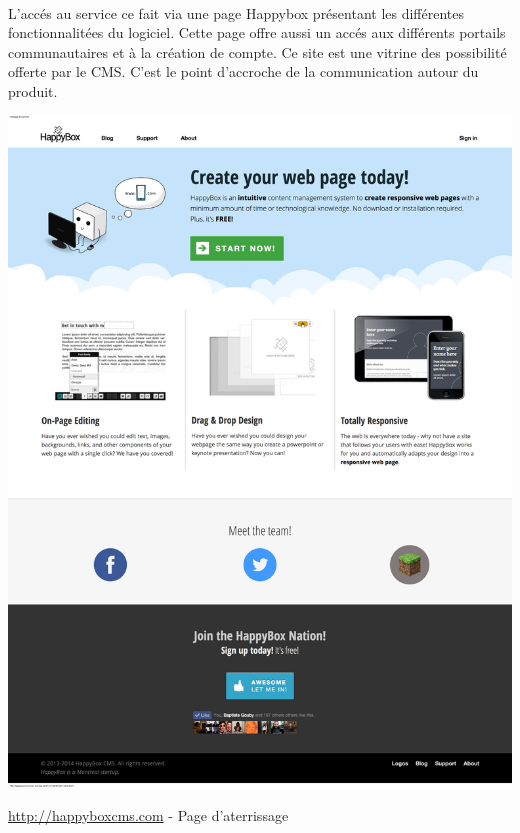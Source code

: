 \documentclass[11pt, a4paper ]{article}
\begin{document}
\begin{spacing}{1.5}


\paragraph{}
L'accés au service ce fait via une page Happybox présentant les différentes fonctionnalitées du logiciel. Cette page offre aussi un accés aux différents portails communautaires et à la création de compte. Ce site est une vitrine des possibilité offerte par le CMS. C'est le point d'accroche de la communication autour du produit.


\begin{center}
		\includegraphics[width=\textwidth]{images/HBscreen/fullLanding.png}
		\caption{\url{http://happyboxcms.com} - Page d'aterrissage}
\end{center}


\end{spacing}
\end{document}
